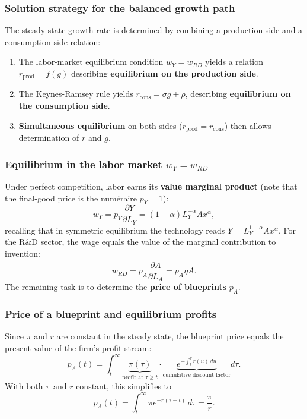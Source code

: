 \subsubsection{Solution strategy for the balanced growth path}

The steady-state growth rate is determined by combining a production-side and a consumption-side relation:
\begin{enumerate}
    \item The labor-market equilibrium condition $w_Y = w_{RD}$ yields a relation $r_{\text{prod}} = f(g)$ describing \textbf{equilibrium on the production side}.
    \item The Keynes-Ramsey rule yields $r_{\text{cons}} = \sigma g + \rho$, describing \textbf{equilibrium on the consumption side}.
    \item \textbf{Simultaneous equilibrium} on both sides ($r_{\text{prod}} = r_{\text{cons}}$) then allows determination of $r$ and $g$.
\end{enumerate}



\subsubsection{Equilibrium in the labor market $w_Y = w_{RD}$}
Under perfect competition, labor earns its \textbf{value marginal product} (note that the final-good price is the numéraire $p_Y = 1$):
\[
    w_Y = p_Y \frac{\partial Y}{\partial L_Y} = (1-\alpha) L_Y^{-\alpha} A x^\alpha,
\]
recalling that in symmetric equilibrium the technology reads $Y = L_Y^{1-\alpha} A x^\alpha$. For the R\&D sector, the wage equals the value of the marginal contribution to invention:
\[
    w_{RD} = p_A \frac{\partial \dot{A}}{\partial L_A} = p_A \eta A.
\]
The remaining task is to determine the \textbf{price of blueprints} $p_A$.

\subsubsection{Price of a blueprint and equilibrium profits}

Since $\pi$ and $r$ are constant in the steady state, the blueprint price equals the present value of the firm's profit stream:
\[
    p_A(t) = \int_t^\infty \underbrace{\pi(\tau)}_{\text{profit at }\tau \geq t} \cdot \underbrace{e^{-\int_t^\tau r(u)\,du}}_{\text{cumulative discount factor}} d\tau.
\]
With both $\pi$ and $r$ constant, this simplifies to
\[
    p_A(t) = \int_t^\infty \pi e^{-r(\tau - t)}\,d\tau = \frac{\pi}{r}.
\]

